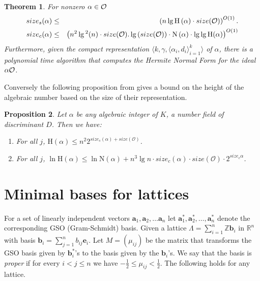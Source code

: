 \documentclass{article}
\newcommand{\height}[1]{\mathrm{H}\left(#1\right)}
\newcommand{\Norm}[1]{\mathrm{N}\left(#1\right)}
\newcommand{\Height}[1]{\ensuremath{\mathrm{H}(#1)}}
\newtheorem{theorem}{Theorem}[section]
\newtheorem{proposition}[theorem]{Proposition}
\theoremstyle{definition}\newtheorem{remark}[theorem]{Remark}
\renewcommand{\vector}[1]{\ensuremath{\mathbf{#1}}}
\begin{document}
\begin{theorem}{\rm\cite{thiel94class}}\label{thm-size-ub}
\label{lem-compute-alphaO}
  For nonzero $\alpha\in\cal{O}$
  \begin{eqnarray*}
    size_s(\alpha) &\leq & \left(n\lg \height{\alpha}\cdot size(\cal{O})\right)^{O(1)}.\\
    size_c(\alpha) &\leq& \left(n^2\lg{}^2(n)\cdot size(\mathcal{O}).
      \lg{(size(\mathcal{O}))}\cdot \Norm{\alpha}\cdot \lg{\lg{\Height{\alpha}}}
    \right)^{O(1)}\\
  \end{eqnarray*}
  Furthermore, given the compact representation $\langle k,
  \gamma,{\langle\alpha_i,d_i\rangle}_{i=1}^k\rangle$ of $\alpha$,
  there is a polynomial time algorithm that computes the Hermite
  Normal Form for the ideal $\alpha \cal{O}$.
\end{theorem}

Conversely the following proposition from \cite{thiel94class} gives a
bound on the height of the algebraic number based on the size of their
representation.

\begin{proposition}\label{prop-size}
  Let $\alpha$ be any algebraic integer of $K$, a number field of
  discriminant $D$. Then we have:
  \begin{enumerate}
  \item For all $j$, $\height{\alpha} \leq n^2 2^{size_s(\alpha) +
      size(\mathcal{O})}$.
  \item For all $j$, $\ln \height{\alpha} \leq \ln \Norm{\alpha} +
    n^3\lg{n}\cdot size_c(\alpha)\cdot size(\mathcal{O})\cdot 
    2^{size_c{\alpha}}$.
  \end{enumerate}
\end{proposition}

\section{Minimal bases for lattices}\label{three}

For a set of linearly independent vectors
$\vector{a}_1,\vector{a}_2,\ldots \vector{a}_n$ let
$\vector{a}_1^*,\vector{a}_2^*,\ldots,\vector{a}_n^*$ denote the
corresponding GSO (Gram-Schmidt) basis.  Given a lattice $\Lambda =
\sum_{i=1}^n \mathbb{Z}\vector{b}_i$ in $\mathbb{R}^n$ with basis
$\vector{b}_i = \sum_{j=1}^n b_{ij} \vector{e}_i$. Let $M =
(\mu_{ij})$ be the matrix that transforms the GSO basis given by
$\vector{b}^*_i$'s to the basis given by the $\vector{b}_i$'s.  We say
that the basis is \emph{proper} if for every $i <j \leq n$ we have
$-\frac{1}{2} \leq \mu_{ij}< \frac{1}{2}$. The following holds for any
lattice.
\end{document}
